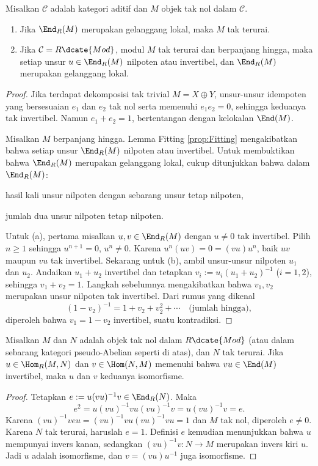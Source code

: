 \begin{lemma}\label{prop:indecomposable-mod-local}
	Misalkan $\mathcal{C}$ adalah kategori aditif dan $M$ objek tak nol dalam $\mathcal{C}$.
	\begin{enumerate}
		\item Jika $\End_R(M)$ merupakan gelanggang lokal, maka $M$ tak terurai.
		\item Jika $\mathcal{C} = R\dcate{Mod}$, modul $M$ tak terurai dan berpanjang hingga, maka setiap unsur $u \in \End_R(M)$ nilpoten atau invertibel, dan $\End_R(M)$ merupakan gelanggang lokal.
	\end{enumerate}
\end{lemma}
\begin{proof}
	Jika terdapat dekomposisi tak trivial $M = X \oplus Y$, unsur-unsur idempoten yang bersesuaian $e_1$ dan $e_2$ tak nol serta memenuhi $e_1 e_2 = 0$, sehingga keduanya tak invertibel. Namun $e_1 + e_2 = 1$, bertentangan dengan kelokalan $\End(M)$.
	
	Misalkan $M$ berpanjang hingga. Lemma Fitting \ref{prop:Fitting} mengakibatkan bahwa setiap unsur $\End_R(M)$ nilpoten atau invertibel. Untuk membuktikan bahwa $\End_R(M)$ merupakan gelanggang lokal, cukup ditunjukkan bahwa dalam $\End_R(M)$:
	\begin{inparaenum}[(a)]
		\item hasil kali unsur nilpoten dengan sebarang unsur tetap nilpoten,
		\item jumlah dua unsur nilpoten tetap nilpoten.
	\end{inparaenum}
Untuk (a), pertama misalkan $u, v \in \End_R(M)$ dengan $u \neq 0$ tak invertibel. Pilih $n \geq 1$ sehingga $u^{n+1}=0$, $u^n \neq 0$. Karena $u^n(uv)=0=(vu)u^n$, baik $uv$ maupun $vu$ tak invertibel. Sekarang untuk (b), ambil unsur-unsur nilpoten $u_1$ dan $u_2$. Andaikan $u_1 + u_2$ invertibel dan tetapkan $v_i := u_i (u_1 + u_2)^{-1}$ ($i=1,2$), sehingga $v_1 + v_2 = 1$. Langkah sebelumnya mengakibatkan bahwa $v_1, v_2$ merupakan unsur nilpoten tak invertibel. Dari rumus yang dikenal
	\[ (1 - v_2)^{-1} = 1 + v_2 + v_2^2 + \cdots \quad \text{(jumlah hingga)}, \]
diperoleh bahwa $v_1 = 1 - v_2$ invertibel, suatu kontradiksi.
\end{proof}

\begin{lemma}\label{prop:indecomposable-lemma}
	Misalkan $M$ dan $N$ adalah objek tak nol dalam $R\dcate{Mod}$ (atau dalam sebarang kategori pseudo-Abelian seperti di atas), dan $N$ tak terurai. Jika $u \in \Hom_R(M,N)$ dan $v \in \Hom(N,M)$ memenuhi bahwa $vu \in \End(M)$ invertibel, maka $u$ dan $v$ keduanya isomorfisme.
\end{lemma}
\begin{proof}
	Tetapkan $e := u(vu)^{-1}v \in \End_R(N)$. Maka
	\[ e^2 = u(vu)^{-1}vu(vu)^{-1}v = u(vu)^{-1}v = e. \]
Karena $(vu)^{-1}veu = (vu)^{-1}vu(vu)^{-1}vu = 1$ dan $M$ tak nol, diperoleh $e \neq 0$. Karena $N$ tak terurai, haruslah $e=1$. Definisi $e$ kemudian menunjukkan bahwa $u$ mempunyai invers kanan, sedangkan $(vu)^{-1}v: N \to M$ merupakan invers kiri $u$. Jadi $u$ adalah isomorfisme, dan $v = (vu)u^{-1}$ juga isomorfisme.
\end{proof}

